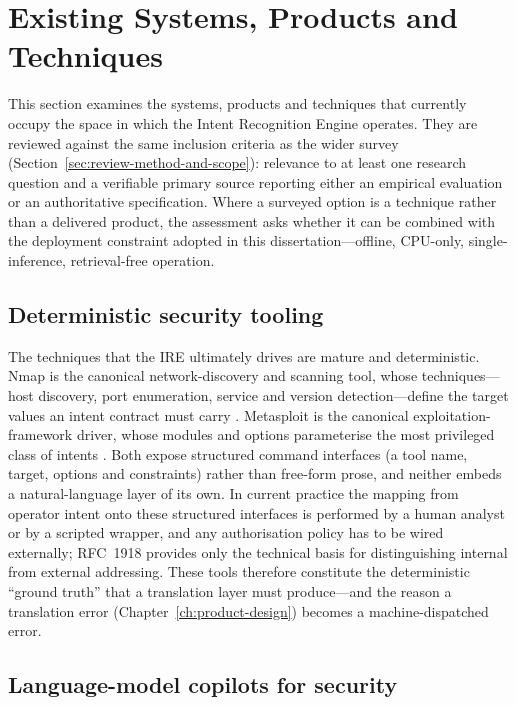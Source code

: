 \section{Existing Systems, Products and Techniques}\label{sec:existing-systems}

This section examines the systems, products and techniques that currently occupy
the space in which the Intent Recognition Engine operates. They are reviewed
against the same inclusion criteria as the wider survey (Section~\ref{sec:review-method-and-scope}): relevance to at
least one research question and a verifiable primary source reporting either an
empirical evaluation or an authoritative specification. Where a surveyed option
is a technique rather than a delivered product, the assessment asks whether it
can be combined with the deployment constraint adopted in this
dissertation---offline, CPU-only, single-inference, retrieval-free operation.

\subsection*{Deterministic security tooling}

The techniques that the IRE ultimately drives are mature and deterministic. Nmap
is the canonical network-discovery and scanning tool, whose techniques---host
discovery, port enumeration, service and version detection---define the target
values an intent contract must carry \parencite{lyon2009nmap}. Metasploit is the
canonical exploitation-framework driver, whose modules and options parameterise
the most privileged class of intents \parencite{metasploit}. Both expose
structured command interfaces (a tool name, target, options and constraints)
rather than free-form prose, and neither embeds a natural-language layer of its
own. In current practice the mapping from operator intent onto these structured
interfaces is performed by a human analyst or by a scripted wrapper, and any
authorisation policy has to be wired externally; RFC~1918 \parencite{rfc1918}
provides only the technical basis for distinguishing internal from external
addressing. These tools therefore constitute the deterministic ``ground truth''
that a translation layer must produce---and the reason a translation error
(Chapter~\ref{ch:product-design}) becomes a machine-dispatched error.

\subsection*{Language-model copilots for security}

